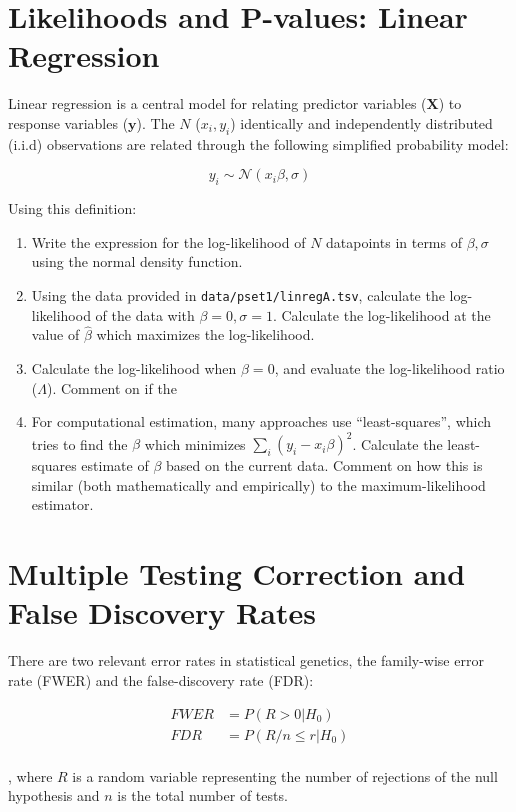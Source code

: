 \documentclass{pset}
\begin{document}
\section*{Likelihoods and P-values: Linear Regression}

Linear regression is a central model for relating predictor variables ($\mathbf{X}$) to response variables ($\mathbf{y}$). The $N$ ($x_i, y_i$) identically and independently distributed (i.i.d) observations are related through the following simplified probability model: 

$$y_i \sim \mathcal{N}(x_i\beta, \sigma)$$ 

Using this definition:

\begin{enumerate}
\item Write the expression for the log-likelihood of $N$ datapoints in terms of $\beta, \sigma$ using the normal density function.
\item Using the data provided in \texttt{data/pset1/linregA.tsv}, calculate the log-likelihood of the data with $\beta = 0,\sigma=1$. Calculate the log-likelihood at the value of $\hat{\beta}$ which maximizes the log-likelihood. 
\item Calculate the log-likelihood when $\beta = 0$, and evaluate the log-likelihood ratio ($\Lambda$). Comment on if the 
\item For computational estimation, many approaches use ``least-squares'', which tries to find the $\beta$ which minimizes $\sum_i (y_i - x_i\beta)^2$. Calculate the least-squares estimate of $\beta$ based on the current data. Comment on how this is similar (both mathematically and empirically) to the maximum-likelihood estimator.
\end{enumerate}

\section*{Multiple Testing Correction and False Discovery Rates}

There are two relevant error rates in statistical genetics, the family-wise error rate (FWER) and the false-discovery rate (FDR):

$$
\begin{aligned}
FWER &= P(R > 0 | H_0)\\
FDR &= P(R/n \leq r | H_0)\\
\end{aligned}
$$

, where $R$ is a random variable representing the number of rejections of the null hypothesis and $n$ is the total number of tests. 
\end{document}
